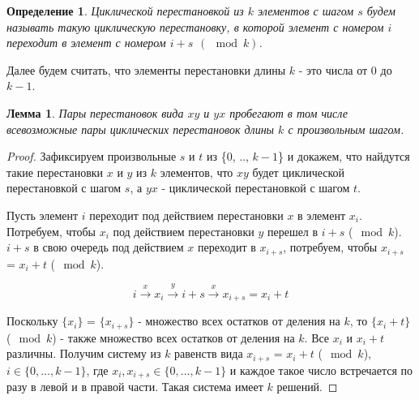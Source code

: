 \documentclass{article}
\newtheorem{lemma}{Лемма}
\newtheorem{definition}{Определение}
\begin{document}
	\begin{definition}
		Циклической перестановкой из $k$ элементов с шагом $s$ будем называть такую циклическую перестановку, в которой элемент с номером $i$ переходит в элемент с номером $i+s \hspace{5pt} (\mod k)$. 
	\end{definition}

	Далее будем считать, что элементы перестановки длины $k$ - это числа от $0$ до $k-1$.
	
	\begin{lemma}
		Пары перестановок вида $xy$ и $yx$ пробегают в том числе всевозможные пары циклических перестановок длины $k$ с произвольным шагом. 
	\end{lemma}

	\begin{proof}
		Зафиксируем произвольные $s$ и $t$ из \{$0$, .., $k-1$\} и докажем, что найдутся такие перестановки $x$ и $y$ из $k$ элементов, что $xy$ будет циклической перестановкой с шагом $s$, а $yx$ - циклической перестановкой с шагом $t$.
		
		
		Пусть элемент $i$ переходит под действием перестановки $x$ в элемент $x_i$. Потребуем, чтобы $x_i$ под действием перестановки $y$ перешел в $i + s$ ($\mod k$). $i + s$ в свою очередь под действием $x$ переходит в $x_{i+s}$, потребуем, чтобы $x_{i+s}$ = $x_i + t$ ($\mod k$).
		
		\begin{equation}
			i \xrightarrow{x} x_i \xrightarrow{y} i+s \xrightarrow{x} x_{i+s} = x_i + t
		\end{equation}
		
		Поскольку $\{x_i\}$ = $\{x_{i+s}\}$ - множество всех остатков от деления на $k$, то $\{x_i + t\}$ ($\mod k$) - также множество всех остатков от деления на $k$. Все $x_i$ и $x_i + t$ различны. 
		Получим систему из $k$ равенств вида $x_{i+s}$ = $x_i + t$ ($\mod k$), $i \in \{0, ..., k-1\}$, где $x_i, x_{i+s} \in \{0, ..., k-1\}$ и каждое такое число встречается по разу в левой и в правой части. Такая система имеет $k$ решений.
		
	\end{proof}
	
\end{document}
